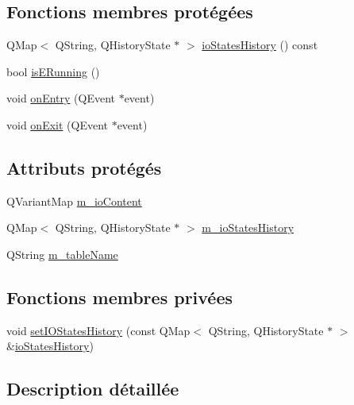 \subsection*{Fonctions membres protégées}
\begin{DoxyCompactItemize}
\item 
Q\-Map$<$ Q\-String, Q\-History\-State $\ast$ $>$ \hyperlink{classSH__InOutStateMachine_a13889998c6dcd17db984dd6ed1454e80}{io\-States\-History} () const 
\item 
bool \hyperlink{classSH__InOutStateMachine_ae6c7448fbe267b035017108a9ffdff2e}{is\-E\-Running} ()
\item 
void \hyperlink{classSH__GenericStateMachine_adfd82f2532595ed7c4bcf21f03cbb951}{on\-Entry} (Q\-Event $\ast$event)
\item 
void \hyperlink{classSH__GenericStateMachine_a4b36d60fa1876908493d3d07f191a30f}{on\-Exit} (Q\-Event $\ast$event)
\end{DoxyCompactItemize}
\subsection*{Attributs protégés}
\begin{DoxyCompactItemize}
\item 
Q\-Variant\-Map \hyperlink{classSH__InOutStateMachine_a8cfbc27eef057bf37b7711bdfef2077e}{m\-\_\-io\-Content}
\item 
Q\-Map$<$ Q\-String, Q\-History\-State $\ast$ $>$ \hyperlink{classSH__InOutStateMachine_ac46ad1af230e1b2156d805275690dec3}{m\-\_\-io\-States\-History}
\item 
Q\-String \hyperlink{classSH__InOutStateMachine_aa009eecc5ab6181358faafb5996b6006}{m\-\_\-table\-Name}
\end{DoxyCompactItemize}
\subsection*{Fonctions membres privées}
\begin{DoxyCompactItemize}
\item 
void \hyperlink{classSH__InOutStateMachine_af51f92c37d00a4eec4da42113cfd7d73}{set\-I\-O\-States\-History} (const Q\-Map$<$ Q\-String, Q\-History\-State $\ast$ $>$ \&\hyperlink{classSH__InOutStateMachine_a13889998c6dcd17db984dd6ed1454e80}{io\-States\-History})
\end{DoxyCompactItemize}


\subsection{Description détaillée}


